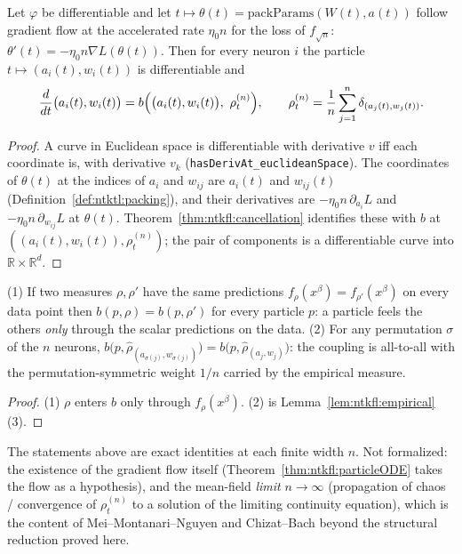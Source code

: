 \begin{theorem}\label{thm:ntkfl:particleODE}
  \leanok
Let $\varphi$ be differentiable and let $t\mapsto\theta(t)=\mathrm{packParams}(W(t),a(t))$ follow gradient flow at the accelerated rate $\eta_0n$ for the loss of $f_{\sqrt n}$: $\theta'(t)=-\eta_0n\nabla L(\theta(t))$.
Then for every neuron $i$ the particle $t\mapsto(a_i(t),w_i(t))$ is differentiable and
\[
  \frac{d}{dt}\bigl(a_i(t),w_i(t)\bigr)=b\Bigl(\bigl(a_i(t),w_i(t)\bigr),\ \rho_t^{(n)}\Bigr),\qquad
  \rho_t^{(n)}=\frac1n\sum_{j=1}^n\delta_{(a_j(t),w_j(t))}.
\]
\end{theorem}

\begin{proof}
  \leanok
A curve in Euclidean space is differentiable with derivative $v$ iff each coordinate is, with derivative $v_k$ (\texttt{hasDerivAt\_euclideanSpace}). The coordinates of $\theta(t)$ at the indices of $a_i$ and $w_{ij}$ are $a_i(t)$ and $w_{ij}(t)$ (Definition~\ref{def:ntktl:packing}), and their derivatives are $-\eta_0n\,\partial_{a_i}L$ and $-\eta_0n\,\partial_{w_{ij}}L$ at $\theta(t)$. Theorem~\ref{thm:ntkfl:cancellation} identifies these with $b$ at $((a_i(t),w_i(t)),\rho_t^{(n)})$; the pair of components is a differentiable curve into $\mathbb R\times\mathbb R^d$.
\end{proof}

\begin{theorem}\label{thm:ntkfl:coupling}
  \leanok
(1) If two measures $\rho,\rho'$ have the same predictions $f_\rho(x^\beta)=f_{\rho'}(x^\beta)$ on every data point then $b(p,\rho)=b(p,\rho')$ for every particle $p$:
a particle feels the others \emph{only} through the scalar predictions on the data.
(2) For any permutation $\sigma$ of the $n$ neurons, $b\bigl(p,\hat\rho_{(a_{\sigma(j)},w_{\sigma(j)})}\bigr)=b\bigl(p,\hat\rho_{(a_j,w_j)}\bigr)$: the coupling is all-to-all with the permutation-symmetric weight $1/n$ carried by the empirical measure.
\end{theorem}

\begin{proof}
  \leanok
(1) $\rho$ enters $b$ only through $f_\rho(x^\beta)$. (2) is Lemma~\ref{lem:ntkfl:empirical}(3).
\end{proof}

\begin{remark}
The statements above are exact identities at each finite width $n$. Not formalized: the existence of the gradient flow itself (Theorem~\ref{thm:ntkfl:particleODE} takes the flow as a hypothesis), and the mean-field \emph{limit} $n\to\infty$ (propagation of chaos / convergence of $\rho_t^{(n)}$ to a solution of the limiting continuity equation), which is the content of Mei--Montanari--Nguyen and Chizat--Bach beyond the structural reduction proved here.
\end{remark}
